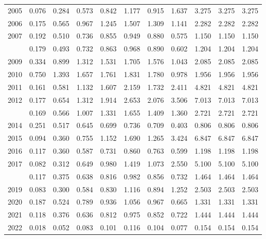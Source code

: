 \documentclass[
]{article}
\begin{document}
\begin{longtable}[t]{lrrrrrrrrrr}
2005 & 0.076 & 0.284 & 0.573 & 0.842 & 1.177 & 0.915 & 1.637 & 3.275 & 3.275 & 3.275\\
2006 & 0.175 & 0.565 & 0.967 & 1.245 & 1.507 & 1.309 & 1.141 & 2.282 & 2.282 & 2.282\\
2007 & 0.192 & 0.510 & 0.736 & 0.855 & 0.949 & 0.880 & 0.575 & 1.150 & 1.150 & 1.150\\
\addlinespace
2008 & 0.179 & 0.493 & 0.732 & 0.863 & 0.968 & 0.890 & 0.602 & 1.204 & 1.204 & 1.204\\
2009 & 0.334 & 0.899 & 1.312 & 1.531 & 1.705 & 1.576 & 1.043 & 2.085 & 2.085 & 2.085\\
2010 & 0.750 & 1.393 & 1.657 & 1.761 & 1.831 & 1.780 & 0.978 & 1.956 & 1.956 & 1.956\\
2011 & 0.161 & 0.581 & 1.132 & 1.607 & 2.159 & 1.732 & 2.411 & 4.821 & 4.821 & 4.821\\
2012 & 0.177 & 0.654 & 1.312 & 1.914 & 2.653 & 2.076 & 3.506 & 7.013 & 7.013 & 7.013\\
\addlinespace
2013 & 0.169 & 0.566 & 1.007 & 1.331 & 1.655 & 1.409 & 1.360 & 2.721 & 2.721 & 2.721\\
2014 & 0.251 & 0.517 & 0.645 & 0.699 & 0.736 & 0.709 & 0.403 & 0.806 & 0.806 & 0.806\\
2015 & 0.094 & 0.360 & 0.755 & 1.152 & 1.690 & 1.265 & 3.424 & 6.847 & 6.847 & 6.847\\
2016 & 0.117 & 0.360 & 0.587 & 0.731 & 0.860 & 0.763 & 0.599 & 1.198 & 1.198 & 1.198\\
2017 & 0.082 & 0.312 & 0.649 & 0.980 & 1.419 & 1.073 & 2.550 & 5.100 & 5.100 & 5.100\\
\addlinespace
2018 & 0.117 & 0.375 & 0.638 & 0.816 & 0.982 & 0.856 & 0.732 & 1.464 & 1.464 & 1.464\\
2019 & 0.083 & 0.300 & 0.584 & 0.830 & 1.116 & 0.894 & 1.252 & 2.503 & 2.503 & 2.503\\
2020 & 0.187 & 0.524 & 0.789 & 0.936 & 1.056 & 0.967 & 0.665 & 1.331 & 1.331 & 1.331\\
2021 & 0.118 & 0.376 & 0.636 & 0.812 & 0.975 & 0.852 & 0.722 & 1.444 & 1.444 & 1.444\\
2022 & 0.018 & 0.052 & 0.083 & 0.101 & 0.116 & 0.104 & 0.077 & 0.154 & 0.154 & 0.154\\*
\end{longtable}
\end{document}

